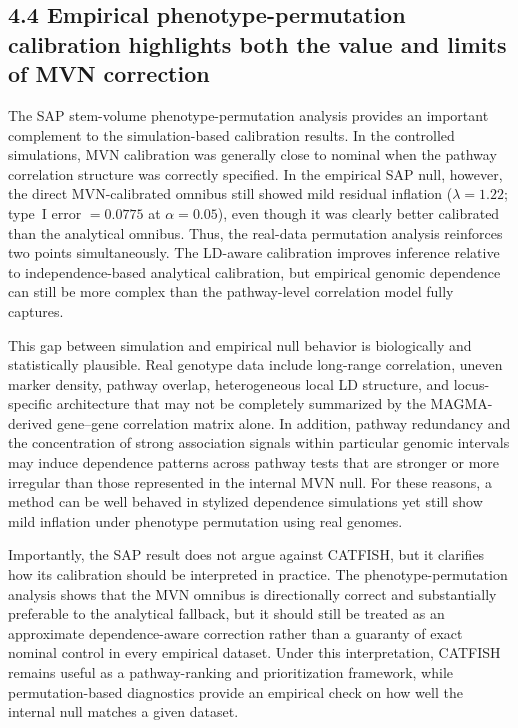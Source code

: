 \documentclass[unnumsec,webpdf,contemporary,large]{oup-authoring-template}%
\theoremstyle{thmstyleone}%
\theoremstyle{thmstyletwo}%
\theoremstyle{thmstylethree}%
\begin{document}
\subsection*{4.4 Empirical phenotype-permutation calibration highlights both the value and limits of MVN correction}

The SAP stem-volume phenotype-permutation analysis provides an important complement to the simulation-based calibration results. In the controlled simulations, MVN calibration was generally close to nominal when the pathway correlation structure was correctly specified. In the empirical SAP null, however, the direct MVN-calibrated omnibus still showed mild residual inflation (\(\lambda = 1.22\); type~I error \(= 0.0775\) at \(\alpha=0.05\)), even though it was clearly better calibrated than the analytical omnibus. Thus, the real-data permutation analysis reinforces two points simultaneously. The LD-aware calibration improves inference relative to independence-based analytical calibration, but empirical genomic dependence can still be more complex than the pathway-level correlation model fully captures.

This gap between simulation and empirical null behavior is biologically and statistically plausible. Real genotype data include long-range correlation, uneven marker density, pathway overlap, heterogeneous local LD structure, and locus-specific architecture that may not be completely summarized by the MAGMA-derived gene--gene correlation matrix alone. In addition, pathway redundancy and the concentration of strong association signals within particular genomic intervals may induce dependence patterns across pathway tests that are stronger or more irregular than those represented in the internal MVN null. For these reasons, a method can be well behaved in stylized dependence simulations yet still show mild inflation under phenotype permutation using real genomes.

Importantly, the SAP result does not argue against CATFISH, but it clarifies how its calibration should be interpreted in practice. The phenotype-permutation analysis shows that the MVN omnibus is directionally correct and substantially preferable to the analytical fallback, but it should still be treated as an approximate dependence-aware correction rather than a guaranty of exact nominal control in every empirical dataset. Under this interpretation, CATFISH remains useful as a pathway-ranking and prioritization framework, while permutation-based diagnostics provide an empirical check on how well the internal null matches a given dataset.
\end{document}
